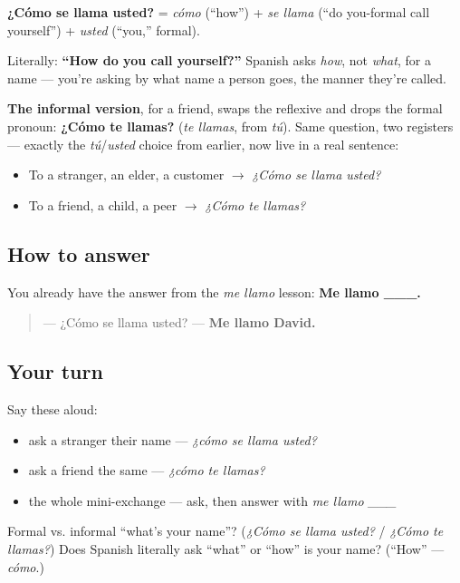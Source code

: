 \begin{cousinweb}
\textbf{¿Cómo se llama usted?} = \emph{cómo} (\textquotedblleft{}how\textquotedblright{}) + \emph{se llama} (\textquotedblleft{}do you-formal call yourself\textquotedblright{}) + \emph{usted} (\textquotedblleft{}you,\textquotedblright{} formal).

Literally: \textbf{\textquotedblleft{}How do you call yourself?\textquotedblright{}} Spanish asks \emph{how}, not \emph{what}, for a name — you're asking by what name a person goes, the manner they're called.

\textbf{The informal version}, for a friend, swaps the reflexive and drops the formal pronoun: \textbf{¿Cómo te llamas?} (\emph{te llamas}, from \emph{tú}). Same question, two registers — exactly the \emph{tú}/\emph{usted} choice from earlier, now live in a real sentence:

\begin{itemize}
\raggedright
  \item To a stranger, an elder, a customer $\to$ \emph{¿Cómo se llama usted?}
  \item To a friend, a child, a peer $\to$ \emph{¿Cómo te llamas?}
\end{itemize}
\end{cousinweb}

\subsection*{How to answer}
You already have the answer from the \emph{me llamo} lesson: \textbf{Me llamo \_\_\_.}

\begin{quote}
— ¿Cómo se llama usted? — \textbf{Me llamo David.}
\end{quote}

\subsection*{Your turn}
Say these aloud:

\begin{itemize}
\raggedright
  \item ask a stranger their name — \emph{¿cómo se llama usted?}
  \item ask a friend the same — \emph{¿cómo te llamas?}
  \item the whole mini-exchange — ask, then answer with \emph{me llamo \_\_\_}
\end{itemize}

\begin{tcolorbox}[breakable,colback=teal!4,colframe=teal!35!black,title={Before you move on}]
Formal vs. informal \textquotedblleft{}what's your name\textquotedblright{}? (\emph{¿Cómo se llama usted?} / \emph{¿Cómo te llamas?}) Does Spanish literally ask \textquotedblleft{}what\textquotedblright{} or \textquotedblleft{}how\textquotedblright{} is your name? (\textquotedblleft{}How\textquotedblright{} — \emph{cómo}.)
\end{tcolorbox}
